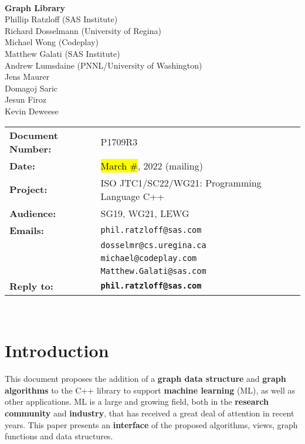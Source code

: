 \documentclass[10pt,onecolumn]{article}
\begin{document}
\begin{titlepage}
~
\vfill
\begin{center}
\LARGE
\textbf{Graph Library}\\
\vspace{12pt}
\normalsize
	Phillip Ratzloff (SAS Institute)\\
	Richard Dosselmann (University of Regina)\\
	Michael Wong (Codeplay)\\
	Matthew Galati (SAS Institute)\\	
	Andrew Lumsdaine (PNNL/University of Washington)\\
	Jens Maurer\\
	Domagoj Saric\\
	Jesun Firoz\\
	Kevin Deweese\\
\end{center}
\vspace{32pt}
\begin{tabular}{ll}
\textbf{Document Number:} & P1709R3\\
\textbf{Date:} & \hl{March \#}, 2022 (mailing)\\ 
\textbf{Project:} & ISO JTC1/SC22/WG21: Programming Language C++\\
\textbf{Audience:} & SG19, WG21, LEWG\\
\textbf{Emails:}
	&\texttt{phil.ratzloff@sas.com}\\
	&\texttt{dosselmr@cs.uregina.ca}\\
	&\texttt{michael@codeplay.com}\\
	&\texttt{Matthew.Galati@sas.com}\\
\textbf{Reply to:}
	&\texttt{\textbf{phil.ratzloff@sas.com}}\\
\end{tabular}
\vfill
~
\end{titlepage}

\tableofcontents

\clearpage

\section{Introduction}
This document proposes the addition of a \textbf{graph data structure} and \textbf{graph algorithms} to the C++ library to support \textbf{machine learning} (ML), as well as other applications. ML is a large and growing field, both in the \textbf{research community} and \textbf{industry}, that has received a great deal of attention in recent years. This paper presents an \textbf{interface} of the proposed algorithms, views, graph functions and data structures.
\end{document}
